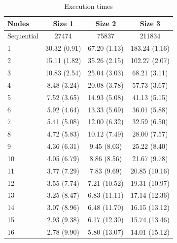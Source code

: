 \documentclass{article}
\begin{document}
\begin{table}[H]
\centering
\begin{tabular}{|l|c|c|c|}
\hline
Nodes & Size 1 & Size 2 & Size 3 \\ \hline
Sequential & 27474 & 75837 & 211834 \\ \hline
1 & 30.32 (0.91) & 67.20 (1.13) & 183.24 (1.16) \\ \hline 
2 & 15.11 (1.82) & 35.26 (2.15) & 102.27 (2.07) \\ \hline 
3 & 10.83 (2.54) & 25.04 (3.03) & 68.21 (3.11) \\ \hline 
4 & 8.48 (3.24) & 20.08 (3.78) & 57.73 (3.67) \\ \hline 
5 & 7.52 (3.65) & 14.93 (5.08) & 41.13 (5.15) \\ \hline 
6 & 5.92 (4.64) & 13.33 (5.69) & 36.01 (5.88) \\ \hline 
7 & 5.41 (5.08) & 12.00 (6.32) & 32.59 (6.50) \\ \hline 
8 & 4.72 (5.83) & 10.12 (7.49) & 28.00 (7.57) \\ \hline 
9 & 4.36 (6.31) & 9.45 (8.03) & 25.22 (8.40) \\ \hline 
10 & 4.05 (6.79) & 8.86 (8.56) & 21.67 (9.78) \\ \hline 
11 & 3.77 (7.29) & 7.83 (9.69) & 20.85 (10.16) \\ \hline 
12 & 3.55 (7.74) & 7.21 (10.52) & 19.31 (10.97) \\ \hline 
13 & 3.25 (8.47) & 6.83 (11.11) & 17.14 (12.36) \\ \hline 
14 & 3.07 (8.96) & 6.48 (11.70) & 16.15 (13.12) \\ \hline 
15 & 2.93 (9.38) & 6.17 (12.30) & 15.74 (13.46) \\ \hline 
16 & 2.78 (9.90) & 5.80 (13.07) & 14.01 (15.12) \\ \hline 
\end{tabular}
\caption{Execution times} \label{tab:times}
\end{table}
\end{document}
